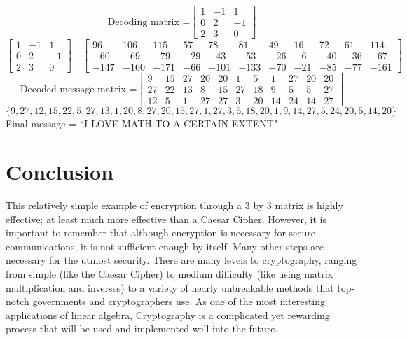 \documentclass{article}
\begin{document}
$$\text{Decoding matrix =}
\begin{bmatrix}
1 & -1 & 1\\
0 & 2 & -1\\
2 & 3 & 0
\end{bmatrix}
$$
$$
\begin{bmatrix}
1 & -1 & 1\\
0 & 2 & -1\\
2 & 3 & 0
\end{bmatrix}
\quad
\begin{bmatrix}
96 & 106 & 115 & 57 & 78 & 81 & 49 & 16 & 72 & 61 & 114\\
-60 & -69 & -79 & -29 & -43 & -53 & -26 & -6 & -40 & -36 & -67 \\
-147 & -160 & -171 & -66 & -101 & -133 & -70 & -21 & -85 & -77 & -161
\end{bmatrix}
$$ 
$$\text{Decoded message matrix =}
\begin{bmatrix}
9 & 15 & 27 & 20 & 20 & 1 & 5 & 1 & 27 & 20 & 20 \\
27 & 22 & 13 & 8 & 15 & 27 & 18 & 9 & 5 & 5 & 27\\
12 & 5 & 1 & 27 & 27 & 3 & 20 & 14 & 24 & 14 & 27
\end{bmatrix}
$$
$$
\{9, 27, 12, 15, 22, 5, 27, 13, 1, 20, 8, 27, 20, 15, 27, 1, 27, 3, 5, 18, 20, 1, 9, 14, 27, 5, 24, 20, 5, 14, 20\}
$$
{\center
Final message = ``I LOVE MATH TO A CERTAIN EXTENT"
\endcenter}

\section{Conclusion}
This relatively simple example of encryption through a 3 by 3 matrix is highly effective; at least much more effective than a Caesar Cipher. However, it is important to remember that although encryption is necessary for secure communications, it is not sufficient enough by itself. Many other steps are necessary for the utmost security. There are many levels to cryptography, ranging from simple (like the Caesar Cipher) to medium difficulty (like using matrix multiplication and inverses) to a variety of nearly unbreakable methods that top-notch governments and cryptographers use. As one of the most interesting applications of linear algebra, Cryptography is a complicated yet rewarding process that will be used and implemented well into the future. \\

\newpage


\end{document}
